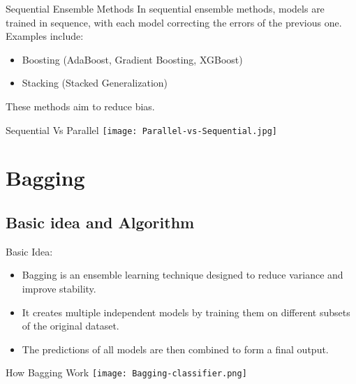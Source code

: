 \documentclass[serif, aspectratio=169]{beamer}
\begin{document}
\begin{frame}{Sequential Ensemble Methods}
    In sequential ensemble methods, models are trained in sequence, with each model correcting the errors of the previous one.
    Examples include:
    \begin{itemize}
        \item Boosting (AdaBoost, Gradient Boosting, XGBoost)
        \item Stacking (Stacked Generalization)
    \end{itemize}
    These methods aim to reduce bias.
\end{frame}

\begin{frame}{Sequential Vs Parallel}
    \centering
    \texttt{[image: Parallel-vs-Sequential.jpg]}
\end{frame}

\section{Bagging}

\subsection{Basic idea and Algorithm}

\begin{frame}{Basic Idea:}
    \begin{itemize}
        \item Bagging is an ensemble learning technique designed to reduce variance and improve stability.
        \item It creates multiple independent models by training them on different subsets of the original dataset.
        \item The predictions of all models are then combined to form a final output.
    \end{itemize}
\end{frame}

\begin{frame}{How Bagging Work}
    \centering
    \texttt{[image: Bagging-classifier.png]}
\end{frame}
\end{document}

